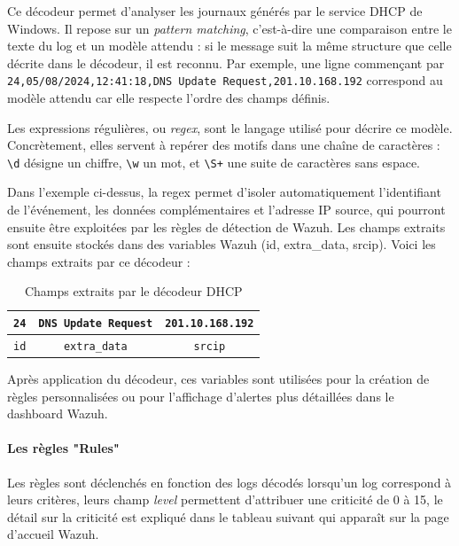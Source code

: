 \documentclass[a4paper, 11pt]{article}
\begin{document}
Ce décodeur permet d'analyser les journaux générés par le service DHCP de Windows. Il repose sur un \textit{pattern matching}, c'est-à-dire une comparaison
 entre le texte du log et un modèle attendu : si le message suit la même structure que celle décrite dans le décodeur, il est reconnu. Par exemple, une ligne
  commençant par \texttt{24,05/08/2024,12:41:18,DNS Update Request,201.10.168.192} correspond au modèle attendu car elle respecte l'ordre des champs définis.
\par\bigskip
Les expressions régulières, ou \textit{regex}, sont le langage utilisé pour décrire ce modèle. Concrètement, elles servent à repérer des motifs dans une chaîne 
de caractères : \texttt{\textbackslash d} désigne un chiffre, \texttt{\textbackslash w} un mot, et \texttt{\textbackslash S+} une suite de caractères sans espace.
\par\bigskip

 Dans l'exemple ci-dessus, la regex permet d'isoler automatiquement l'identifiant de l'événement, les données complémentaires
   et l'adresse IP source, qui pourront ensuite être exploitées par les règles de détection de Wazuh.
   Les champs extraits sont ensuite stockés dans des variables Wazuh (id, extra\_data, srcip).
    Voici les champs extraits par ce décodeur :


\begin{table}[H]
\centering
\scriptsize
\renewcommand{\arraystretch}{2}

\begin{tabular}{|c|c|c|}
\hline
\cellcolor{blue!15}\texttt{24} &
\cellcolor{orange!20}\texttt{DNS Update Request} &
\cellcolor{red!15}\texttt{201.10.168.192} \\
\hline
\texttt{id} &
\texttt{extra\_data} &
\texttt{srcip} \\
\hline
\end{tabular}

\caption{Champs extraits par le décodeur DHCP}
\label{tab:dhcp_decoder}
\end{table}

Après application du décodeur, ces variables sont utilisées pour la création de règles personnalisées ou pour l'affichage d'alertes
      plus détaillées dans le dashboard Wazuh.

\paragraph{Les règles "Rules"}

Les règles sont déclenchés en fonction des logs décodés lorsqu'un log correspond à leurs critères, leurs champ \textit{level} permettent d'attribuer 
une criticité de 0 à 15, le détail sur la criticité est expliqué dans le tableau suivant qui apparaît sur la page d'accueil Wazuh.\\
\end{document}
